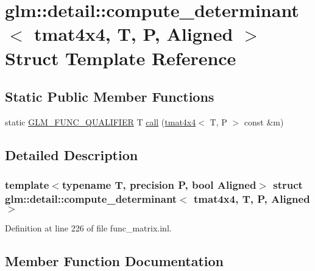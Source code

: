 \hypertarget{structglm_1_1detail_1_1compute__determinant_3_01tmat4x4_00_01_t_00_01_p_00_01_aligned_01_4}{}\section{glm\+::detail\+::compute\+\_\+determinant$<$ tmat4x4, T, P, Aligned $>$ Struct Template Reference}
\label{structglm_1_1detail_1_1compute__determinant_3_01tmat4x4_00_01_t_00_01_p_00_01_aligned_01_4}
\subsection*{Static Public Member Functions}
\begin{DoxyCompactItemize}
\item 
static \mbox{\hyperlink{setup_8hpp_a33fdea6f91c5f834105f7415e2a64407}{G\+L\+M\+\_\+\+F\+U\+N\+C\+\_\+\+Q\+U\+A\+L\+I\+F\+I\+ER}} T \mbox{\hyperlink{structglm_1_1detail_1_1compute__determinant_3_01tmat4x4_00_01_t_00_01_p_00_01_aligned_01_4_ad11c7e1b074be572d4af7ba440866ea3}{call}} (\mbox{\hyperlink{structglm_1_1tmat4x4}{tmat4x4}}$<$ T, P $>$ const \&m)
\end{DoxyCompactItemize}


\subsection{Detailed Description}
\subsubsection*{template$<$typename T, precision P, bool Aligned$>$\newline
struct glm\+::detail\+::compute\+\_\+determinant$<$ tmat4x4, T, P, Aligned $>$}



Definition at line 226 of file func\+\_\+matrix.\+inl.



\subsection{Member Function Documentation}
\mbox{\label{structglm_1_1detail_1_1compute__determinant_3_01tmat4x4_00_01_t_00_01_p_00_01_aligned_01_4_ad11c7e1b074be572d4af7ba440866ea3}} 
